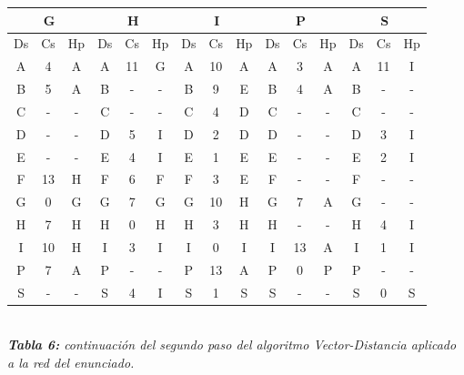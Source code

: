 \documentclass[letterpaper,10pt,onecolumn,titlepage]{article}
\begin{document}
  \begin{center}
   \begin{tabular}{|c|c|c|c|c|c|c|c|c|c|c|c|c|c|c|} \hline
     \multicolumn{3}{|c|}{G} & \multicolumn{3}{|c|}{H} &\multicolumn{3}{|c|}{I} & \multicolumn{3}{|c|}{P} & \multicolumn{3}{|c|}{S}    \\ \hline
     Ds & Cs & Hp & Ds & Cs & Hp & Ds & Cs & Hp & Ds & Cs & Hp & Ds & Cs & Hp  \\ \hline
     A  & 4  & A  & A  & \color{red}11  & \color{red}G  & A  & 10  & A  & A  & 3  & A  & A  & \color{red}11  & \color{red}I   \\ \hline
     B  & \color{red}5  & \color{red}A  & B  & -  & -  & B  & \color{red}9  &\color{red} E  & B  & \color{red}4  & \color{red}A  & B  & -  & -   \\ \hline
     C  & -  & -  & C  & -  & -  & C  & \color{red}4  &\color{red} D  & C  & -  & -  & C  & -  & -   \\ \hline
     D  & -  & -  & D  & \color{red}5  & \color{red}I  & D  & 2  & D  & D  & -  & -  & D  & \color{red}3  &\color{red} I   \\ \hline
     E  & -  & -  & E  & \color{red}4  &\color{red} I  & E  & 1  & E  & E  & -  & -  & E  & \color{red}2  & \color{red}I   \\ \hline
     F  & \color{red}13  & \color{red}H  & F  & 6  & F  & F  & \color{red}3  & \color{red}E  & F  & -  & -  & F  & -  & -   \\ \hline
     G  & 0  & G  & G  & 7  & G  & G  & \color{red}10  & \color{red}H  & G  & \color{red}7  & \color{red}A  & G  & -  & -   \\ \hline
     H  & 7  & H  & H  & 0  & H  & H  & 3  & H  & H  & -  & -  & H  & \color{red}4  &\color{red} I   \\ \hline
     I  & \color{red}10  & \color{red}H  & I  & 3  & I  & I  & 0  & I  & I  & \color{red}13  & \color{red}A  & I  & 1  & I   \\ \hline
     P  & \color{red}7  & \color{red}A  & P  & -  & -  & P  & \color{red}13  & \color{red}A  & P  & 0  & P  & P  & -  & -   \\ \hline
     S  & -  & -  & S  & \color{red}4  &\color{red} I  & S  & 1  & S  & S  & -  & -  & S  & 0  & S   \\ \hline
   \end{tabular}\\
   \textit{\textbf{Tabla 6:} continuación del segundo paso del algoritmo Vector-Distancia aplicado a la red del enunciado.}
 \end{center}
 
\end{document}
